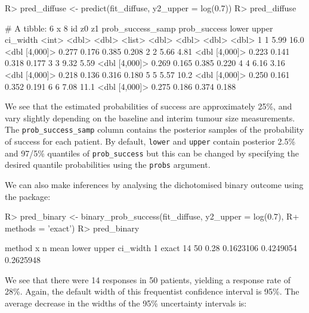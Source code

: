 \documentclass[article]{jss}
\begin{document}
\begin{CodeChunk}

\begin{CodeInput}
R> pred_diffuse <- predict(fit_diffuse, y2_upper = log(0.7))
R> pred_diffuse %
\end{CodeInput}

\begin{CodeOutput}
# A tibble: 6 x 8
     id    z0    z1 prob_success_samp prob_success lower upper ci_width
  <int> <dbl> <dbl> <list>                   <dbl> <dbl> <dbl>    <dbl>
1     1  5.99 16.0  <dbl [4,000]>            0.277 0.176 0.385    0.208
2     2  5.66  4.81 <dbl [4,000]>            0.223 0.141 0.318    0.177
3     3  9.32  5.59 <dbl [4,000]>            0.269 0.165 0.385    0.220
4     4  6.16  3.16 <dbl [4,000]>            0.218 0.136 0.316    0.180
5     5  5.57 10.2  <dbl [4,000]>            0.250 0.161 0.352    0.191
6     6  7.08 11.1  <dbl [4,000]>            0.275 0.186 0.374    0.188
\end{CodeOutput}
\end{CodeChunk}

We see that the estimated probabilities of success are approximately
25\%, and vary slightly depending on the baseline and interim tumour
size measurements. The \texttt{prob\_success\_samp} column contains the
posterior samples of the probability of success for each patient. By
default, \texttt{lower} and \texttt{upper} contain posterior 2.5\% and
97/5\% quantiles of \texttt{prob\_success} but this can be changed by
specifying the desired quantile probabilities using the \texttt{probs}
argument.

We can also make inferences by analysing the dichotomised binary outcome
using the  \citep{binom} package:

\begin{CodeChunk}

\begin{CodeInput}
R> pred_binary <- binary_prob_success(fit_diffuse, y2_upper = log(0.7), 
R+                                    methods = 'exact')
R> pred_binary
\end{CodeInput}

\begin{CodeOutput}
  method  x  n mean     lower     upper  ci_width
1  exact 14 50 0.28 0.1623106 0.4249054 0.2625948
\end{CodeOutput}
\end{CodeChunk}

We see that there were 14 responses in 50 patients, yielding a response
rate of 28\%. Again, the default width of this frequentist confidence
interval is 95\%. The average decrease in the widths of the 95\%
uncertainty intervals is:
\end{document}
